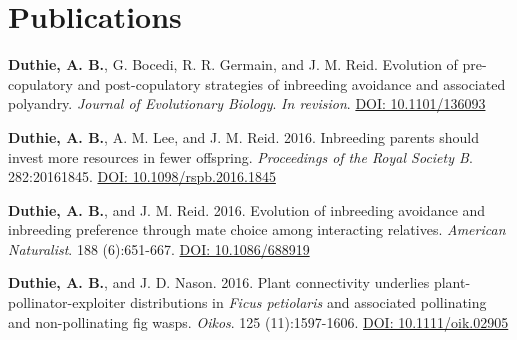 \documentclass[letterpaper]{article}
\begin{document}
\section*{Publications}
\begin{etaremune}
\item {\bf Duthie, A. B.}, G. Bocedi, R. R. Germain, and J. M. Reid. Evolution of pre-copulatory and post-copulatory strategies of inbreeding avoidance and associated polyandry. {\it Journal of Evolutionary Biology}. {\it In revision}. \href{http://www.biorxiv.org/content/early/2017/08/19/136093}{DOI: 10.1101/136093}
\item {\bf Duthie, A. B.}, A. M. Lee, and J. M. Reid. 2016. Inbreeding parents should invest more resources in fewer offspring. {\it Proceedings of the Royal Society B}. 282:20161845. \href{http://rspb.royalsocietypublishing.org/content/283/1843/20161845}{DOI: 10.1098/rspb.2016.1845}
\item {\bf Duthie, A. B.}, and J. M. Reid. 2016. Evolution of inbreeding avoidance and inbreeding preference through mate choice among interacting relatives. {\it American Naturalist}. 188 (6):651-667. \href{http://www.journals.uchicago.edu/doi/full/10.1086/688919}{DOI: 10.1086/688919}
\item {\bf Duthie, A. B.}, and J. D. Nason. 2016. Plant connectivity underlies plant-pollinator-exploiter distributions in {\it Ficus petiolaris} and associated pollinating and non-pollinating fig wasps. {\it Oikos}. 125 (11):1597-1606. \href{http://onlinelibrary.wiley.com/doi/10.1111/oik.02905/abstract}{DOI: 10.1111/oik.02905}

\end{etaremune}
\end{document}
